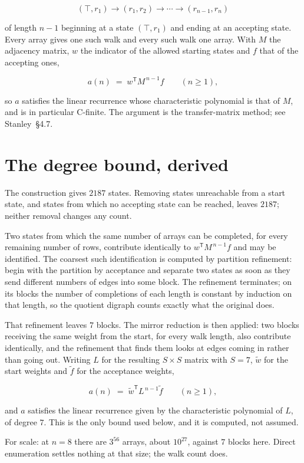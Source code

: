 \documentclass[11pt]{article}
\theoremstyle{definition}
\begin{document}
\[(\top,r_1) \to (r_1,r_2) \to \cdots \to (r_{n-1},r_n)\]

of length $n-1$ beginning at a state $(\top,r_1)$ and ending at an accepting state. Every array gives one such walk and every such walk one array. With $M$ the adjacency matrix, $w$ the indicator of the allowed starting states and $f$ that of the accepting ones,

\[a(n) \;=\; w^{\mathsf T} M^{\,n-1} f \qquad (n \ge 1),\]

so $a$ satisfies the linear recurrence whose characteristic polynomial is that of $M$, and is in particular C-finite. The argument is the transfer-matrix method; see Stanley~\S4.7.

\section{The degree bound, derived}

The construction gives $2187$ states. Removing states unreachable from a start state, and states from which no accepting state can be reached, leaves $2187$; neither removal changes any count.

Two states from which the same number of arrays can be completed, for every remaining number of rows, contribute identically to $w^{\mathsf T}M^{\,n-1}f$ and may be identified. The coarsest such identification is computed by partition refinement: begin with the partition by acceptance and separate two states as soon as they send different numbers of edges into some block. The refinement terminates; on its blocks the number of completions of each length is constant by induction on that length, so the quotient digraph counts exactly what the original does.

That refinement leaves $7$ blocks. The mirror reduction is then applied: two blocks receiving the same weight from the start, for every walk length, also contribute identically, and the refinement that finds them looks at edges coming in rather than going out. Writing $L$ for the resulting $S \times S$ matrix with $S = 7$, $\tilde w$ for the start weights and $\tilde f$ for the acceptance weights,

\[a(n) \;=\; \tilde w^{\mathsf T} L^{\,n-1} \tilde f \qquad (n \ge 1),\]

and $a$ satisfies the linear recurrence given by the characteristic polynomial of $L$, of degree $7$. This is the only bound used below, and it is computed, not assumed.

For scale: at $n = 8$ there are $3^{56}$ arrays, about $10^{27}$, against $7$ blocks here. Direct enumeration settles nothing at that size; the walk count does.
\end{document}

